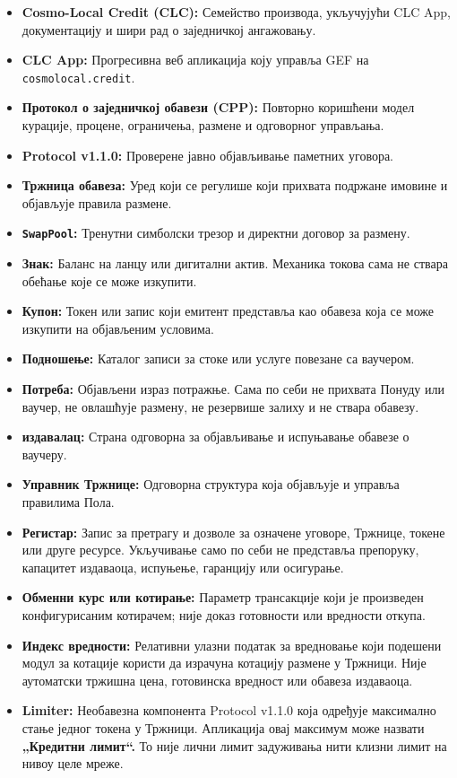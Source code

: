 \documentclass[11pt]{article}
\begin{document}
\begin{itemize}[leftmargin=*]
\item \textbf{Cosmo-Local Credit (CLC):} Семейство производа, укључујући CLC App, документацију и шири рад о заједничкој ангажовању.
\item \textbf{CLC App:} Прогресивна веб апликација коју управља GEF на \texttt{cosmolocal.credit}.
\item \textbf{Протокол о заједничкој обавези (CPP):} Повторно коришћени модел курације, процене, ограничења, размене и одговорног управљања.
\item \textbf{Protocol v1.1.0:} Проверене јавно објављивање паметних уговора.
\item \textbf{Тржница обавеза:} Уред који се регулише који прихвата подржане имовине и објављује правила размене.
\item \textbf{\texttt{SwapPool}:} Тренутни симболски трезор и директни договор за размену.
\item \textbf{Знак:} Баланс на ланцу или дигитални актив. Механика токова сама не ствара обећање које се може изкупити.
\item \textbf{Купон:} Токен или запис који емитент представља као обавеза која се може изкупити на објављеним условима.
\item \textbf{Подношење:} Каталог записи за стоке или услуге повезане са ваучером.
\item \textbf{Потреба:} Објављени израз потражње. Сама по себи не прихвата Понуду или ваучер, не овлашћује размену, не резервише залиху и не ствара обавезу.
\item \textbf{издавалац:} Страна одговорна за објављивање и испуњавање обавезе о ваучеру.
\item \textbf{Управник Тржнице:} Одговорна структура која објављује и управља правилима Пола.
\item \textbf{Регистар:} Запис за претрагу и дозволе за означене уговоре, Тржнице, токене или друге ресурсе. Укључивање само по себи не представља препоруку, капацитет издаваоца, испуњење, гаранцију или осигурање.
\item \textbf{Обменни курс или котирање:} Параметр трансакције који је произведен конфигурисаним котирачем; није доказ готовности или вредности откупа.
\item \textbf{Индекс вредности:} Релативни улазни податак за вредновање који подешени модул за котације користи да израчуна котацију размене у Тржници. Није аутоматски тржишна цена, готовинска вредност или обавеза издаваоца.
\item \textbf{Limiter:} Необавезна компонента Protocol v1.1.0 која одређује максимално стање једног токена у Тржници. Апликација овај максимум може назвати \textbf{„Кредитни лимит``.} То није лични лимит задуживања нити клизни лимит на нивоу целе мреже.

\end{itemize}
\end{document}
